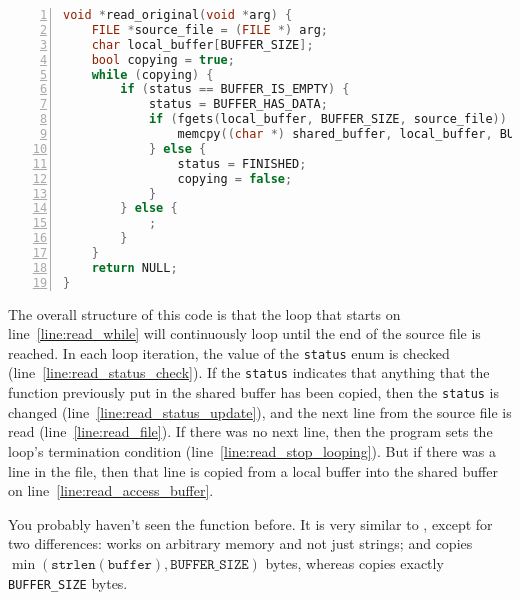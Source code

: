%    
\begin{lstlisting}[language=c, numbers=left, escapechar=`]
void *read_original(void *arg) {
    FILE *source_file = (FILE *) arg;
    char local_buffer[BUFFER_SIZE];
    bool copying = true;                                                    `\label{line:read_before_while}`
    while (copying) {                                                       `\label{line:read_while}`
        if (status == BUFFER_IS_EMPTY) {                                    `\label{line:read_status_check}`
            status = BUFFER_HAS_DATA;                                       `\label{line:read_status_update}`
            if (fgets(local_buffer, BUFFER_SIZE, source_file)) {            `\label{line:read_file}`
                memcpy((char *) shared_buffer, local_buffer, BUFFER_SIZE);  `\label{line:read_access_buffer}`
            } else {
                status = FINISHED;                                          `\label{line:read_final_status_update}`
                copying = false;                                            `\label{line:read_stop_looping}`
            }
        } else {                                                            `\label{line:read_empty_else}`
            ;
        }
    }
    return NULL;
}
\end{lstlisting}

    The overall structure of this code is that the loop that starts on line~\ref{line:read_while} will continuously loop until the end of the source file is reached.
    In each loop iteration, the value of the \lstinline{status} enum is checked (line~\ref{line:read_status_check}).
    If the \lstinline{status} indicates that anything that the  function previously put in the shared buffer has been copied, then the \lstinline{status} is changed (line~\ref{line:read_status_update}), and the next line from the source file is read (line~\ref{line:read_file}).
    If there was no next line, then the program sets the loop's termination condition (line~\ref{line:read_stop_looping}).
    But if there was a line in the file, then that line is copied from a local buffer into the shared buffer on line~\ref{line:read_access_buffer}.

    You probably haven't seen the  function before.
    It is very similar to , except for two differences:
     works on arbitrary memory and not just strings;
    and  copies $\min\left(\mathtt{strlen(buffer)},\mathtt{BUFFER\_SIZE}\right)$ bytes, whereas  copies exactly \lstinline{BUFFER_SIZE} bytes.

